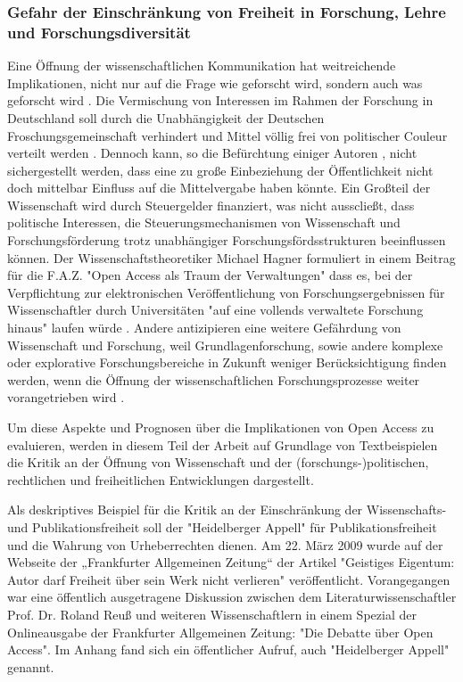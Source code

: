 \subsubsection{Gefahr der Einschränkung von Freiheit in Forschung, Lehre und Forschungsdiversität}

Eine Öffnung der wissenschaftlichen Kommunikation hat weitreichende Implikationen, nicht nur auf die Frage wie geforscht wird, sondern auch was geforscht wird \cite{suchen}. Die Vermischung von Interessen im Rahmen der Forschung in Deutschland soll durch die Unabhängigkeit der Deutschen Froschungsgemeinschaft verhindert und Mittel völlig frei von politischer Couleur verteilt werden \cite{suchen}. Dennoch kann, so die Befürchtung einiger Autoren \cite{suchen}, nicht sichergestellt werden, dass eine zu große Einbeziehung der Öffentlichkeit nicht doch mittelbar Einfluss auf die Mittelvergabe haben könnte. Ein Großteil der Wissenschaft wird durch Steuergelder finanziert, was nicht ausscließt, dass politische Interessen, die Steuerungsmechanismen von Wissenschaft und Forschungsförderung trotz unabhängiger Forschungsfördsstrukturen beeinflussen können. Der Wissenschaftstheoretiker Michael Hagner formuliert in einem Beitrag für die F.A.Z. "Open Access als Traum der Verwaltungen" dass es, bei der Verpflichtung zur elektronischen Veröffentlichung von Forschungsergebnissen für Wissenschaftler durch Universitäten "auf eine vollends verwaltete Forschung hinaus" laufen würde \cite{suchen}. Andere antizipieren eine weitere Gefährdung von Wissenschaft und Forschung, weil Grundlagenforschung, sowie andere komplexe oder explorative Forschungsbereiche in Zukunft weniger Berücksichtigung finden werden, wenn die Öffnung der wissenschaftlichen Forschungsprozesse weiter vorangetrieben wird \cite{suchen} \cite{suchen} \cite{suchen}. 

Um diese Aspekte und Prognosen über die Implikationen von Open Access zu evaluieren, werden in diesem Teil der Arbeit auf Grundlage von Textbeispielen die Kritik an der Öffnung von Wissenschaft und der (forschungs-)politischen, rechtlichen und freiheitlichen Entwicklungen dargestellt.

Als deskriptives Beispiel für die Kritik an der Einschränkung der Wissenschafts- und Publikationsfreiheit soll der "Heidelberger Appell" für Publikationsfreiheit und die Wahrung von Urheberrechten dienen. Am 22. März 2009 wurde auf der Webseite der „Frankfurter Allgemeinen Zeitung“ der Artikel "Geistiges Eigentum: Autor darf Freiheit über sein Werk nicht verlieren" \cite{faz_heidelberger_apell_2009} veröffentlicht. Vorangegangen war eine öffentlich ausgetragene Diskussion zwischen dem Literaturwissenschaftler Prof. Dr. Roland Reuß und weiteren Wissenschaftlern in einem Spezial der Onlineausgabe der Frankfurter Allgemeinen Zeitung: "Die Debatte über Open Access". Im Anhang fand sich ein öffentlicher Aufruf, auch "Heidelberger Appell" genannt. 

